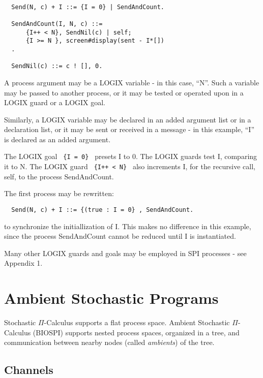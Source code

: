 \begin{verbatim}

  Send(N, c) + I ::= {I = 0} | SendAndCount.

  SendAndCount(I, N, c) ::=
      {I++ < N}, SendNil(c) | self;
      {I >= N }, screen#display(sent - I*[])
  .

  SendNil(c) ::= c ! [], 0.
\end{verbatim}

\noindent
A process argument may be a LOGIX variable - in this case, ``N''.
Such a variable may be passed to another process, or it may be
tested or operated upon in a LOGIX guard or a LOGIX goal.

\noindent
Similarly, a LOGIX variable may be declared in an added argument
list or in a declaration list, or it may be sent or
received in a message - in this example, ``I'' is declared
as an added argument.

\noindent
The LOGIX goal \verb+ {I = 0} + presets I to 0.
\noindent
The LOGIX guards test I, comparing it to N.
The LOGIX guard \verb# {I++ < N} # also increments I, for the
recursive call, self, to the process SendAndCount.

\noindent
The first process may be rewritten:

\begin{verbatim}
  Send(N, c) + I ::= {(true : I = 0} , SendAndCount.
\end{verbatim}

\noindent
to synchronize the initiallization of I.  This makes no difference
in this example, since the process SendAndCount cannot be reduced
until I is instantiated.

\noindent
Many other LOGIX guards and goals may be employed in SPI processes -
see \cite{logix:user-man} Appendix 1.

\chapter{Ambient Stochastic Programs}
\label{aspic}

Stochastic $\Pi$-Calculus supports a flat process space.  Ambient
Stochastic $\Pi$-Calculus (BIOSPI) supports nested process spaces,
organized in a tree, and
communication between nearby nodes (called {\em ambients}) of the tree.

\section{Channels}

